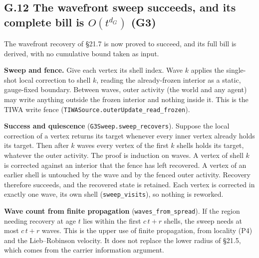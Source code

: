 \documentclass[
]{article}
\begin{document}
\subsection{\texorpdfstring{G.12 The wavefront sweep succeeds, and its
complete bill is \(O(t^{d_G})\)
(G3)}{G.12 The wavefront sweep succeeds, and its complete bill is O(t\^{}\{d\_G\}) (G3)}}\label{g.12-the-wavefront-sweep-succeeds-and-its-complete-bill-is-otd_g-g3}

The wavefront recovery of §21.7 is now proved to succeed, and its full
bill is derived, with no cumulative bound taken as input.

\textbf{Sweep and fence.} Give each vertex its shell index. Wave \(k\)
applies the single-shot local correction to shell \(k\), reading the
already-frozen interior as a static, gauge-fixed boundary. Between
waves, outer activity (the world and any agent) may write anything
outside the frozen interior and nothing inside it. This is the TIWA
write fence
(\texttt{T\allowbreak{}I\allowbreak{}W\allowbreak{}A\allowbreak{}S\allowbreak{}o\allowbreak{}u\allowbreak{}r\allowbreak{}c\allowbreak{}e\allowbreak{}.\allowbreak{}o\allowbreak{}u\allowbreak{}t\allowbreak{}e\allowbreak{}r\allowbreak{}U\allowbreak{}p\allowbreak{}d\allowbreak{}a\allowbreak{}t\allowbreak{}e\allowbreak{}\_\allowbreak{}r\allowbreak{}e\allowbreak{}a\allowbreak{}d\allowbreak{}\_\allowbreak{}f\allowbreak{}r\allowbreak{}o\allowbreak{}z\allowbreak{}e\allowbreak{}n}).

\textbf{Success and quiescence}
(\texttt{G\allowbreak{}3\allowbreak{}S\allowbreak{}w\allowbreak{}e\allowbreak{}e\allowbreak{}p\allowbreak{}.\allowbreak{}s\allowbreak{}w\allowbreak{}e\allowbreak{}e\allowbreak{}p\allowbreak{}\_\allowbreak{}r\allowbreak{}e\allowbreak{}c\allowbreak{}o\allowbreak{}v\allowbreak{}e\allowbreak{}r\allowbreak{}s}).
Suppose the local correction of a vertex returns its target whenever
every inner vertex already holds its target. Then after \(k\) waves
every vertex of the first \(k\) shells holds its target, whatever the
outer activity. The proof is induction on waves. A vertex of shell \(k\)
is corrected against an interior that the fence has left recovered. A
vertex of an earlier shell is untouched by the wave and by the fenced
outer activity. Recovery therefore succeeds, and the recovered state is
retained. Each vertex is corrected in exactly one wave, its own shell
(\texttt{sweep\_visits}), so nothing is reworked.

\textbf{Wave count from finite propagation}
(\texttt{w\allowbreak{}a\allowbreak{}v\allowbreak{}e\allowbreak{}s\allowbreak{}\_\allowbreak{}f\allowbreak{}r\allowbreak{}o\allowbreak{}m\allowbreak{}\_\allowbreak{}s\allowbreak{}p\allowbreak{}r\allowbreak{}e\allowbreak{}a\allowbreak{}d}).
If the region needing recovery at age \(t\) lies within the first
\(c\,t+r\) shells, the sweep needs at most \(c\,t+r\) waves. This is the
upper use of finite propagation, from locality (P4) and the
Lieb--Robinson velocity. It does not replace the lower radius of §21.5,
which comes from the carrier information argument.
\end{document}
